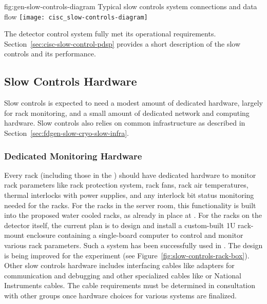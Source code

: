 \begin{dunefigure}{fig:gen-slow-controls-diagram}
{Typical slow controls system connections and data flow}
\texttt{[image: cisc\_slow-controls-diagram]}
\end{dunefigure}

The  detector control system\cite{pdspdcs_proc} fully met its operational requirements. %
Section~\ref{sec:cisc-slow-control-pdsp} provides a short description of the  slow controls and its performance.

 \subsection{Slow Controls Hardware}
\label{sec:fdgen-slow-cryo-hdwr}

Slow controls is expected to need a modest amount of dedicated hardware, largely for rack monitoring,  %
and a small amount of dedicated network and
computing hardware. %
Slow controls also relies on common
infrastructure as described in
Section~\ref{sec:fdgen-slow-cryo-slow-infra}.

\subsubsection{Dedicated Monitoring Hardware}

Every rack (including those in the ) should have dedicated hardware to monitor rack parameters like rack protection system, rack fans, rack air temperatures, thermal interlocks with power supplies, and any interlock bit status monitoring needed for the racks. For the racks in the  server room, this functionality is built into the proposed water cooled racks, as already in place at .  For the racks on the detector itself, the current plan is to design and install a custom-built 1U rack-mount enclosure containing a single-board computer to control and monitor various rack parameters. Such a system has been successfully used in . The design is being improved for the  experiment (see Figure~\ref{fig:slow-controls-rack-box}). Other slow controls hardware includes interfacing cables like adapters for communication and debugging and other specialized cables like   or National Instruments cables. The cable requirements must be determined in consultation with other groups once hardware choices for various systems are finalized.

